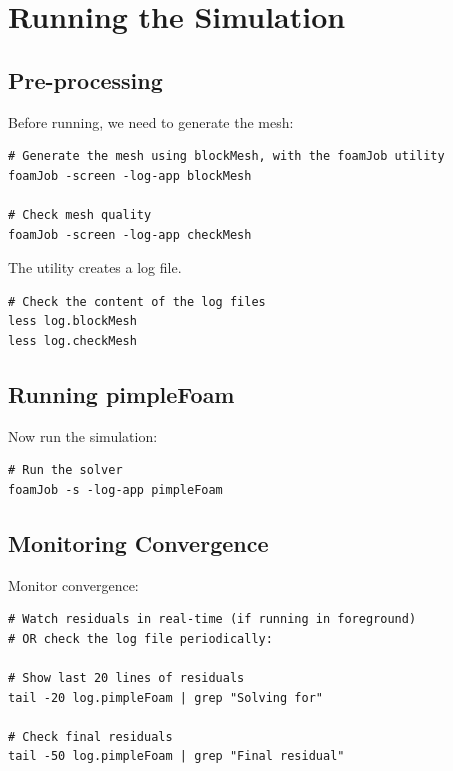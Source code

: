 \documentclass[
    parskip=half,      %
    DIV=12,            %
    headings=normal,   %
    fontsize=11pt,     %
    english            %
]{scrartcl}
\begin{document}

\section{Running the Simulation}

\subsection{Pre-processing}
Before running, we need to generate the mesh:

\begin{lstlisting}[style=terminal]
# Generate the mesh using blockMesh, with the foamJob utility
foamJob -screen -log-app blockMesh

# Check mesh quality
foamJob -screen -log-app checkMesh
\end{lstlisting}


The utility  creates a log file.
 
\begin{lstlisting}[style=terminal]
# Check the content of the log files
less log.blockMesh
less log.checkMesh
\end{lstlisting}

\subsection{Running pimpleFoam}
Now run the simulation:

\begin{lstlisting}[style=terminal]
# Run the solver
foamJob -s -log-app pimpleFoam

\end{lstlisting}

\subsection{Monitoring Convergence}
Monitor convergence:

\begin{lstlisting}[style=terminal]
# Watch residuals in real-time (if running in foreground)
# OR check the log file periodically:

# Show last 20 lines of residuals
tail -20 log.pimpleFoam | grep "Solving for"

# Check final residuals
tail -50 log.pimpleFoam | grep "Final residual"
\end{lstlisting}
\end{document}
